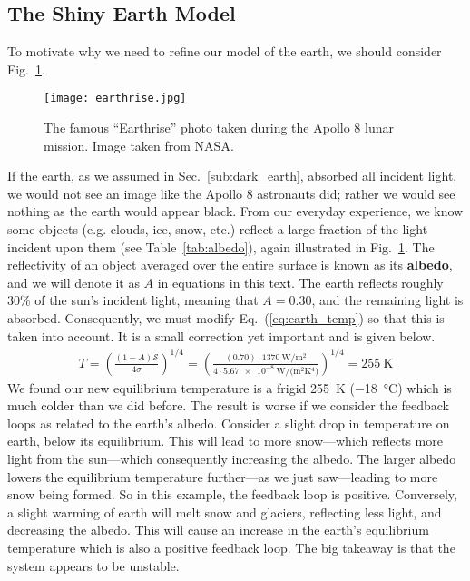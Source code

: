     \subsection{The Shiny Earth Model} %
    \label{sub:shiny_earth}
   
    To motivate why we need to refine our model of the earth, we should consider Fig.~\ref{fig:earthrise}.

    \begin{figure}[hb!]
        \centering
        \texttt{[image: earthrise.jpg]}
        \caption{The famous ``Earthrise'' photo taken during the Apollo 8 lunar mission. Image taken from NASA.}
        \label{fig:earthrise}
    \end{figure}

    If the earth, as we assumed in Sec.~\ref{sub:dark_earth}, absorbed all incident light, we would not see an image like the Apollo 8 astronauts did; rather we would see nothing as the earth would appear black.  From our everyday experience, we know some objects (e.g. clouds, ice, snow, etc.) reflect a large fraction of the light incident upon them (see Table~\ref{tab:albedo}), again illustrated in Fig.~\ref{fig:earthrise}. The reflectivity of an object averaged over the entire surface is known as its \textbf{albedo}, and we will denote it as $A$ in equations in this text. The earth reflects roughly 30\% of the sun's incident light, meaning that $A = 0.30$, and the remaining light is absorbed.\cite{schroeder1999introduction,thorndike1976energy} Consequently, we must modify Eq.~(\ref{eq:earth_temp}) so that this is taken into account. It is a small correction yet important and is given below.
    \begin{align}
        T = \left( \frac{(1-A) \mathcal{S}}{4 \sigma} \right)^{1/4} = \left( \frac{(0.70) \cdot \SI{1370}{\watt/\meter^2}}{4 \cdot \SI{5.67e-8}{\watt/(\meter^2 \kelvin^4)} } \right)^{1/4} = \SI{255}{\kelvin}
        \label{eq:shiny_earth_temp}
    \end{align}
    We found our new equilibrium temperature is a frigid \SI{255}{\kelvin} (\SI{-18}{\celsius}) which is much colder than we did before. The result is worse if we consider the feedback loops as related to the earth's albedo. Consider a slight drop in temperature on earth, below its equilibrium. This will lead to more snow---which reflects more light from the sun---which consequently increasing the albedo. The larger albedo lowers the equilibrium temperature further---as we just saw---leading to more snow being formed. So in this example, the feedback loop is positive. Conversely, a slight warming of earth  will melt snow and glaciers, reflecting less light, and decreasing the albedo. This will cause an increase in the earth's equilibrium temperature which is also a positive feedback loop. The big takeaway is that the system appears to be unstable.

